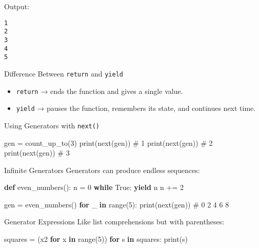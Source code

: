 \documentclass[
  letterpaper,
  DIV=11,
  numbers=noendperiod]{scrreprt}
\newenvironment{Shaded}{\begin{snugshade}}{\end{snugshade}}
\newcommand{\BuiltInTok}[1]{\textcolor[rgb]{0.00,0.23,0.31}{#1}}
\newcommand{\CommentTok}[1]{\textcolor[rgb]{0.37,0.37,0.37}{#1}}
\newcommand{\ControlFlowTok}[1]{\textcolor[rgb]{0.00,0.23,0.31}{\textbf{#1}}}
\newcommand{\DecValTok}[1]{\textcolor[rgb]{0.68,0.00,0.00}{#1}}
\newcommand{\KeywordTok}[1]{\textcolor[rgb]{0.00,0.23,0.31}{\textbf{#1}}}
\newcommand{\NormalTok}[1]{\textcolor[rgb]{0.00,0.23,0.31}{#1}}
\newcommand{\OperatorTok}[1]{\textcolor[rgb]{0.37,0.37,0.37}{#1}}
\newcommand{\VariableTok}[1]{\textcolor[rgb]{0.07,0.07,0.07}{#1}}
\providecommand{\tightlist}{%
  \setlength{\itemsep}{0pt}\setlength{\parskip}{0pt}}
\begin{document}
Output:

\begin{verbatim}
1
2
3
4
5
\end{verbatim}

Difference Between \texttt{return} and \texttt{yield}

\begin{itemize}
\tightlist
\item
  \texttt{return} → ends the function and gives a single value.
\item
  \texttt{yield} → pauses the function, remembers its state, and
  continues next time.
\end{itemize}

Using Generators with \texttt{next()}

\begin{Shaded}
\begin{Highlighting}[]
\NormalTok{gen }\OperatorTok{=}\NormalTok{ count\_up\_to(}\DecValTok{3}\NormalTok{)}
\BuiltInTok{print}\NormalTok{(}\BuiltInTok{next}\NormalTok{(gen))  }\CommentTok{\# 1}
\BuiltInTok{print}\NormalTok{(}\BuiltInTok{next}\NormalTok{(gen))  }\CommentTok{\# 2}
\BuiltInTok{print}\NormalTok{(}\BuiltInTok{next}\NormalTok{(gen))  }\CommentTok{\# 3}
\end{Highlighting}
\end{Shaded}

Infinite Generators Generators can produce endless sequences:

\begin{Shaded}
\begin{Highlighting}[]
\KeywordTok{def}\NormalTok{ even\_numbers():}
\NormalTok{    n }\OperatorTok{=} \DecValTok{0}
    \ControlFlowTok{while} \VariableTok{True}\NormalTok{:}
        \ControlFlowTok{yield}\NormalTok{ n}
\NormalTok{        n }\OperatorTok{+=} \DecValTok{2}

\NormalTok{gen }\OperatorTok{=}\NormalTok{ even\_numbers()}
\ControlFlowTok{for}\NormalTok{ \_ }\KeywordTok{in} \BuiltInTok{range}\NormalTok{(}\DecValTok{5}\NormalTok{):}
    \BuiltInTok{print}\NormalTok{(}\BuiltInTok{next}\NormalTok{(gen))   }\CommentTok{\# 0 2 4 6 8}
\end{Highlighting}
\end{Shaded}

Generator Expressions Like list comprehensions but with parentheses:

\begin{Shaded}
\begin{Highlighting}[]
\NormalTok{squares }\OperatorTok{=}\NormalTok{ (x2 }\ControlFlowTok{for}\NormalTok{ x }\KeywordTok{in} \BuiltInTok{range}\NormalTok{(}\DecValTok{5}\NormalTok{))}
\ControlFlowTok{for}\NormalTok{ s }\KeywordTok{in}\NormalTok{ squares:}
    \BuiltInTok{print}\NormalTok{(s)}
\end{Highlighting}
\end{Shaded}
\end{document}
